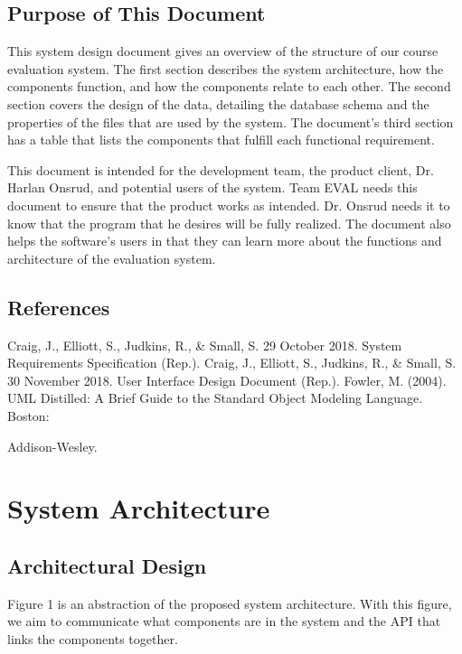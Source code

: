 \documentclass{article}
\begin{document}
\subsection{Purpose of This Document}

This system design document gives an overview of the structure of our course evaluation system. The first section describes the system architecture, how the components function, and how the components relate to each other. The second section covers the design of the data, detailing the database schema and the properties of the files that are used by the system. The document's third section has a table that lists the components that fulfill each functional requirement.

This document is intended for the development team, the product client, Dr. Harlan Onsrud, and potential users of the system. Team EVAL needs this document to ensure that the product works as intended. Dr. Onsrud needs it to know that the program that he desires will be fully realized. The document also helps the software's users in that they can learn more about the functions and architecture of the evaluation system.

\subsection{References}

Craig, J., Elliott, S., Judkins, R., \& Small, S. 29 October 2018. System Requirements Specification (Rep.).
\vspace{3mm}\newline
Craig, J., Elliott, S., Judkins, R., \& Small, S. 30 November 2018. User Interface Design Document (Rep.).
\vspace{3mm}\newline
Fowler, M. (2004). UML Distilled: A Brief Guide to the Standard Object Modeling Language. Boston:

Addison-Wesley.

\section{System Architecture}
\subsection{Architectural Design}

Figure 1 is an abstraction of the proposed system architecture. With this figure, we aim to communicate what components are in the system and the API that links the components together.
\end{document}

